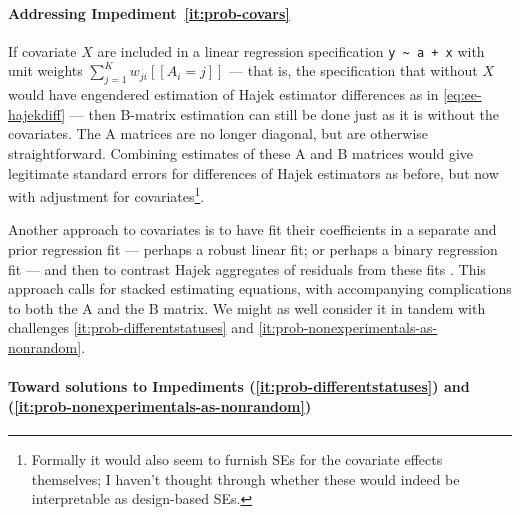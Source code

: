 \paragraph{Addressing Impediment~\ref{it:prob-covars}}
If covariate \(X\)  are included in a linear regression specification
\verb|y ~ a + x| with
unit weights $\sum_{j=1}^{K}w_{ji}[\![A_{i}=j]\!]$ --- that is, the
specification that without \(X\) would have engendered estimation
of Hajek estimator differences as in \eqref{eq:ee-hajekdiff} ---
then B-matrix estimation can still be done just
as it is without the covariates.  The A matrices are no longer
diagonal, but are otherwise straightforward.  Combining estimates of
these A and B matrices would give legitimate standard errors for
differences of Hajek estimators as before, but now with adjustment for
covariates\footnote{Formally it would also seem to furnish SEs for the
covariate effects themselves; I haven't thought through whether these
would indeed be interpretable as design-based SEs.%
}.

Another approach to covariates is to have fit their coefficients in a separate and
prior regression fit --- perhaps a robust linear fit; or perhaps a binary
regression fit --- and then to contrast Hajek aggregates of residuals
from these fits \citep{gelmanPardoe07,bowers:hans:2008}.  This approach calls for
stacked estimating equations, with accompanying complications to both
the A and the B matrix. We might as well consider it in tandem with
challenges \ref{it:prob-differentstatuses} and
\ref{it:prob-nonexperimentals-as-nonrandom}. 

\paragraph{Toward solutions to Impediments (\ref{it:prob-differentstatuses}) and
(\ref{it:prob-nonexperimentals-as-nonrandom})}


